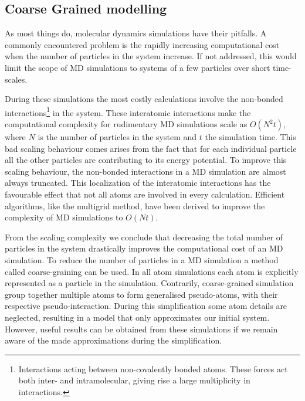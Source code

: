 \subsection{Coarse Grained modelling}
As most things do, molecular dynamics simulations have their pitfalls. A commonly
encountered problem is the rapidly increasing computational cost when the number of
particles in the system increase. If not addressed, this would limit the scope of MD
simulations to systems of a few particles over short time-scales.

During these simulations the most costly calculations involve the non-bonded
interactions\footnote{Interactions acting between non-covalently bonded atoms. These
forces act both inter- and intramolecular, giving rise a large multiplicity in
interactions.} in the system. These interatomic interactions make the computational
complexity for rudimentary MD simulations scale as $O(N^2t)$, where $N$ is the number of
particles in the system and $t$ the simulation time. This bad scaling behaviour comes
arises from the fact that for each individual particle all the other particles are
contributing to its energy potential. To improve this scaling behaviour, the non-bonded
interactions in a MD simulation are almost always truncated. This localization of the
interatomic interactions has the favourable effect that not all atoms are involved in
every calculation. Efficient algorithms, like the multigrid method, have been derived
to improve the complexity of MD simulations to $O(Nt)$. \cite{Celeste2001}

From the scaling complexity we conclude that decreasing the total number of particles in
the system drastically improves the computational cost of an MD simulation. To reduce the
number of particles in a MD simulation a method called coarse-graining can be used.
In all atom simulations each atom is explicitly represented as a particle in the
simulation. Contrarily, coarse-grained simulation group together multiple atoms to form
generalised pseudo-atoms, with their respective pseudo-interaction. During this
simplification some atom details are neglected, resulting in a model that only
approximates our initial system. However, useful results can be obtained from
these simulations if we remain aware of the made approximations during the
simplification.


